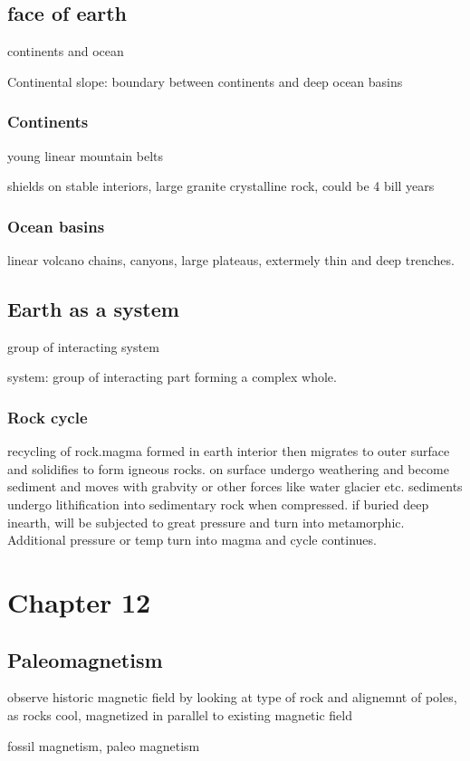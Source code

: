 \documentclass[11pt]{amsart}
\begin{document}
  \subsection{face of earth}
  \par continents and ocean
  \par Continental slope: boundary between continents and deep ocean basins
  \subsubsection{Continents}
  \par young linear mountain belts
  \par shields on stable interiors, large granite crystalline rock, could be 4
  bill years
  \subsubsection{Ocean basins}
  \par linear volcano chains, canyons, large plateaus, extermely thin and deep
  trenches.
  \subsection{Earth as a system}
  \par group of interacting system
  \par system: group of interacting part forming a complex whole.
  \subsubsection{Rock cycle}
  \par recycling of rock.magma formed in earth interior  then migrates to outer
  surface and solidifies to form igneous rocks. on surface undergo weathering
  and become sediment and moves with grabvity or other forces like water
  glacier etc. sediments undergo lithification into sedimentary rock when
  compressed. if buried deep inearth, will be subjected to great pressure and
  turn into metamorphic. Additional pressure or temp turn into magma and cycle
  continues.




  \section{Chapter 12}
  \subsection{Paleomagnetism}
  \par observe historic magnetic field by looking at type of rock and alignemnt
  of poles, as rocks cool, magnetized in parallel to existing magnetic field
  \par fossil magnetism, paleo magnetism
\end{document}
